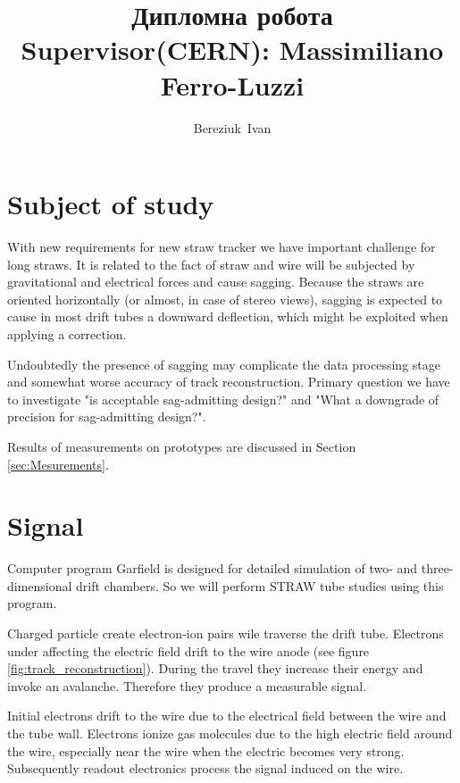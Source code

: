 \documentclass[12pt,a4paper]{article}
\author{Bereziuk~Ivan}
\title{ Дипломна робота \\
		Supervisor(CERN): Massimiliano Ferro-Luzzi\\
		}
\begin{document}
	 \linenumbers
	\maketitle
	\newpage
	
		
	\begin{spacing}{1}
	 
	\end{spacing}	

 \section{Subject of study}
	
	With new requirements for new straw tracker we have important challenge for long straws. It is related to the fact of straw and wire will be subjected by gravitational and electrical forces and cause sagging. Because the straws are oriented horizontally (or almost, in case of stereo views), sagging is expected to cause in most drift tubes a downward deflection, which might be exploited
when applying a correction.

	Undoubtedly the presence of sagging may complicate the data processing stage and somewhat worse accuracy of track reconstruction. Primary question we have to investigate "is acceptable sag-admitting design?" and "What a downgrade of precision for sag-admitting design?".
	
	Results of measurements on prototypes are discussed in Section \ref{sec:Mesurements}.
	
	
	\section{Signal}	
	Computer program Garfield \cite{garfield} is designed for detailed simulation of two- and three-dimensional drift chambers. So we will perform STRAW tube studies using this program.
	
	Charged particle  create electron-ion pairs wile traverse the drift tube. Electrons under affecting the electric field drift to the wire anode (see figure \ref{fig:track_reconstruction}). During the travel they increase their energy and invoke an avalanche. Therefore they produce a measurable signal.

	Initial electrons drift to the wire due to the electrical field between the wire and the tube wall. Electrons ionize gas molecules due to the high electric field around the wire, especially near the wire when the electric becomes very strong.  Subsequently readout electronics process the signal induced on the wire.
	  
\end{document}
